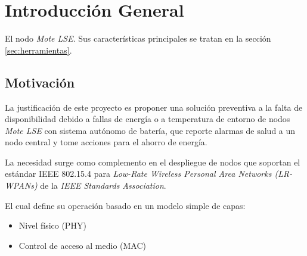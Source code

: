 
\chapter{Introducción General} %

\label{Chapter1} %
\label{IntroGeneral}


\newcommand{\keyword}[1]{\textbf{#1}}
\newcommand{\tabhead}[1]{\textbf{#1}}
\newcommand{\code}[1]{\texttt{#1}}
\newcommand{\file}[1]{\texttt{\bfseries#1}}
\newcommand{\option}[1]{\texttt{\itshape#1}}
\newcommand{\grados}{$^{\circ}$}


El nodo \textit{Mote LSE}. Sus características principales se tratan en la sección \ref{sec:herramientas}.


\section{Motivación}
\label{sec:Motivación}

La justificación de este proyecto es proponer una solución preventiva a la falta de disponibilidad debido a fallas de energía o a temperatura de entorno de nodos \textit{Mote LSE} con sistema autónomo de batería, que reporte alarmas de salud a un nodo central y tome acciones para el ahorro de energía.

La necesidad surge como complemento en el despliegue de nodos que soportan el estándar IEEE 802.15.4 \citep{802.15.4} para \textit{Low-Rate Wireless Personal Area Networks (LR-WPANs)} de la \textit{IEEE Standards Association}.

El cual define su operación basado en un modelo simple de capas:
		\begin{itemize}
			\item Nivel físico (PHY)
			\item Control de acceso al medio (MAC)
		\end{itemize}

